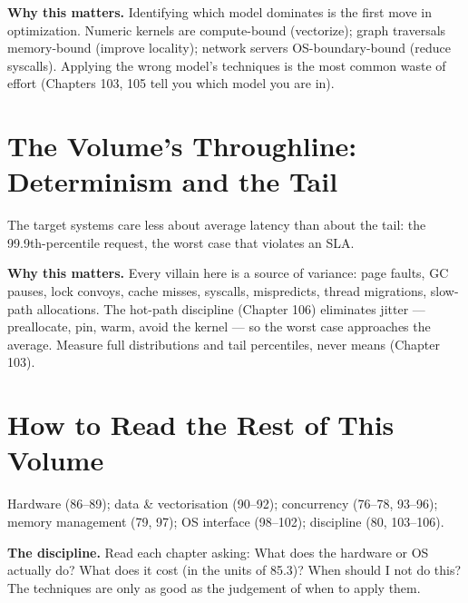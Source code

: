\textbf{Why this matters.} Identifying which model dominates is the first move in optimization. Numeric kernels are compute-bound (vectorize); graph traversals memory-bound (improve locality); network servers OS-boundary-bound (reduce syscalls). Applying the wrong model's techniques is the most common waste of effort (Chapters 103, 105 tell you which model you are in).

\section{The Volume's Throughline: Determinism and the Tail}
The target systems care less about average latency than about the tail: the 99.9th-percentile request, the worst case that violates an SLA.

\textbf{Why this matters.} Every villain here is a source of variance: page faults, GC pauses, lock convoys, cache misses, syscalls, mispredicts, thread migrations, slow-path allocations. The hot-path discipline (Chapter 106) eliminates jitter --- preallocate, pin, warm, avoid the kernel --- so the worst case approaches the average. Measure full distributions and tail percentiles, never means (Chapter 103).

\section{How to Read the Rest of This Volume}
Hardware (86--89); data \& vectorisation (90--92); concurrency (76--78, 93--96); memory management (79, 97); OS interface (98--102); discipline (80, 103--106).

\textbf{The discipline.} Read each chapter asking: What does the hardware or OS actually do? What does it cost (in the units of 85.3)? When should I not do this? The techniques are only as good as the judgement of when to apply them.
